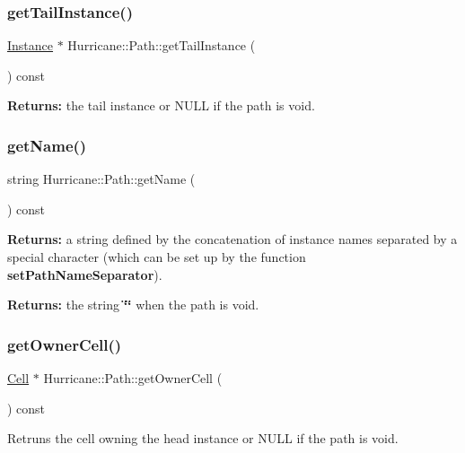 \subsubsection{\texorpdfstring{get\+Tail\+Instance()}{getTailInstance()}}
{\footnotesize\ttfamily \mbox{\hyperlink{classHurricane_1_1Instance}{Instance}} $\ast$ Hurricane\+::\+Path\+::get\+Tail\+Instance (\begin{DoxyParamCaption}{ }\end{DoxyParamCaption}) const}

{\bfseries Returns\+:} the tail instance or N\+U\+LL if the path is void. \mbox{\label{classHurricane_1_1Path_a97ff25c53f4e7bdacb7cb8a58adf6499}} 
\subsubsection{\texorpdfstring{get\+Name()}{getName()}}
{\footnotesize\ttfamily string Hurricane\+::\+Path\+::get\+Name (\begin{DoxyParamCaption}{ }\end{DoxyParamCaption}) const}

{\bfseries Returns\+:} a string defined by the concatenation of instance names separated by a special character (which can be set up by the function {\bfseries set\+Path\+Name\+Separator}).

{\bfseries Returns\+:} the string {\bfseries \char`\"{}\char`\"{}} when the path is void. \mbox{\label{classHurricane_1_1Path_a0954eb842af9d863ea701aa0b681412e}} 
\subsubsection{\texorpdfstring{get\+Owner\+Cell()}{getOwnerCell()}}
{\footnotesize\ttfamily \mbox{\hyperlink{classHurricane_1_1Cell}{Cell}} $\ast$ Hurricane\+::\+Path\+::get\+Owner\+Cell (\begin{DoxyParamCaption}{ }\end{DoxyParamCaption}) const}

Retruns the cell owning the head instance or N\+U\+LL if the path is void. \mbox{\label{classHurricane_1_1Path_a3f4a865f570375ec5b6e5cb487369696}} 
